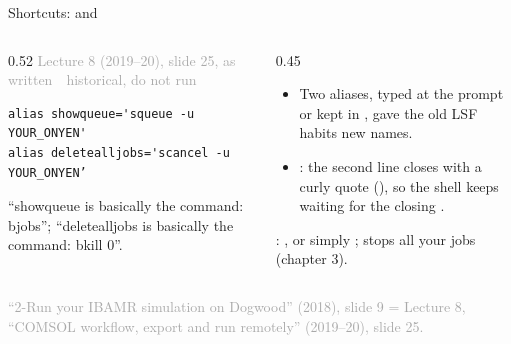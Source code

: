 \documentclass[aspectratio=169,11pt]{beamer}
\newcommand{\sourcecredit}[1]{\vfill\begin{flushright}\tiny\textcolor{DarkGray}{#1}\end{flushright}}
\newcommand{\hist}[1]{{\tiny\sffamily\textcolor{DarkGray}{#1\ \textbullet\ historical, do not run}}\par\nointerlineskip\vspace{0.3mm}}
\begin{document}
\begin{frame}[fragile]{Shortcuts:  and }
\label{fr:aliases}
\begin{columns}[T,onlytextwidth]
\begin{column}{0.52\textwidth}
\hist{Lecture 8 (2019--20), slide 25, as written}
\begin{lstlisting}[style=hist]
alias showqueue='squeue -u YOUR_ONYEN'
alias deletealljobs='scancel -u YOUR_ONYEN’
\end{lstlisting}
\footnotesize ``showqueue is basically the command: bjobs''; ``deletealljobs is basically the command: bkill 0''.
\end{column}
\begin{column}{0.45\textwidth}
\footnotesize
\begin{itemize}\setlength{\itemsep}{2pt}
  \item Two aliases, typed at the prompt or kept in , gave the old LSF habits new names.
  \item {}: the second line closes with a curly quote (), so the shell keeps waiting for the closing .
\end{itemize}
\vspace{1mm}
: , or simply ;  stops all your jobs (chapter 3).
\end{column}
\end{columns}
\sourcecredit{``2-Run your IBAMR simulation on Dogwood'' (2018), slide 9 = Lecture 8, ``COMSOL workflow, export and run remotely'' (2019--20), slide 25.}
\end{frame}
\end{document}
